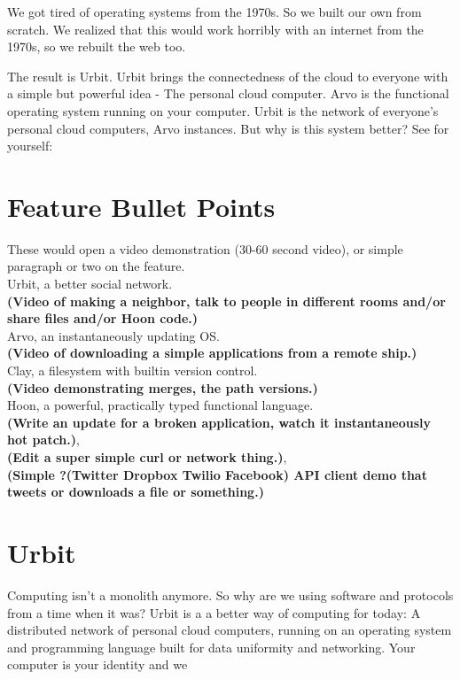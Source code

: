 \documentclass[12]{article}
\begin{document}
We got tired of operating systems from the 1970s.  So we built our own from scratch.
We realized that this would work horribly with an internet from the 1970s, so we rebuilt the web too.

The result is Urbit.  Urbit brings the connectedness of the cloud to everyone with a simple but powerful idea - The personal cloud computer.
Arvo is the functional operating system running on your computer.  Urbit is the network of everyone's personal cloud computers, Arvo instances.
But why is this system better?  See for yourself:


\section*{Feature Bullet Points}
These would open a video demonstration (30-60 second video), or simple paragraph or two on the feature. \\ 

	Urbit, a better social network. \\
	\textbf{(Video of making a neighbor, talk to people in different rooms and/or share files and/or Hoon code.)} \\

	Arvo, an instantaneously updating OS. \\
	 \textbf{(Video of downloading a simple applications from a remote ship.)} \\

	Clay, a filesystem with builtin version control. \\
	\textbf{(Video demonstrating merges, the path versions.)} \\

	Hoon, a powerful, practically typed functional language.  \\
	\textbf{(Write an update for a broken application, watch it instantaneously hot patch.)}, \\
	\textbf{(Edit a super simple curl or network thing.)}, \\
	\textbf{(Simple ?(Twitter Dropbox Twilio Facebook) API client demo that tweets or downloads a file or something.)} \\


\section*{Urbit}

Computing isn't a monolith anymore.  So why are we using software and protocols from a time when it was?
Urbit is a a better way of computing for today:  A distributed network of personal cloud computers,
running on an operating system and programming language built for data uniformity and networking.
Your computer is your identity and we 
\end{document}
